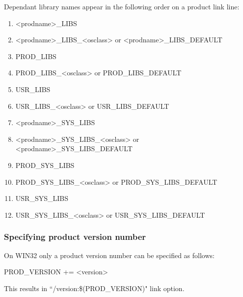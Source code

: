 Dependant library names appear in the following order on a product link line:

\begin{enumerate}\item \textless{}prodname\textgreater{}\_LIBS

\item \textless{}prodname\textgreater{}\_LIBS\_\textless{}osclass\textgreater{} or \textless{}prodname\textgreater{}\_LIBS\_DEFAULT

\item {}PROD\_LIBS

\item PROD\_LIBS\_\textless{}osclass\textgreater{} or PROD\_LIBS\_DEFAULT

\item {}USR\_LIBS

\item USR\_LIBS\_\textless{}osclass\textgreater{} or USR\_LIBS\_DEFAULT

\item \textless{}prodname\textgreater{}\_SYS\_LIBS

\item \textless{}prodname\textgreater{}\_SYS\_LIBS\_\textless{}osclass\textgreater{} or \textless{}prodname\textgreater{}\_SYS\_LIBS\_DEFAULT

\item {}PROD\_SYS\_LIBS

\item PROD\_SYS\_LIBS\_\textless{}osclass\textgreater{} or PROD\_SYS\_LIBS\_DEFAULT

\item {}USR\_SYS\_LIBS

\item USR\_SYS\_LIBS\_\textless{}osclass\textgreater{} or USR\_SYS\_LIBS\_DEFAULT

\end{enumerate}\subsubsection{Specifying product version number}

On WIN32 only a product version number can be specified as follows:

\begin{description}\item {}PROD\_VERSION += \textless{}version\textgreater{}

\end{description}This results in ``/version:\$(PROD\_VERSION)" link option.

